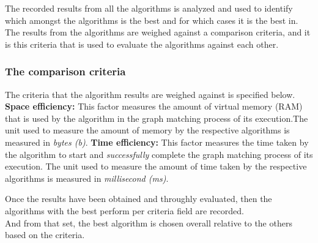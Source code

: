 The recorded results from all the algorithms is analyzed and used to identify which amongst the algorithms is the best and for which cases it is the best in.\\
The results from the algorithms are weighed against a comparison criteria, and it is this criteria that is used to evaluate the algorithms against each other.\\

\subsubsection{The comparison criteria}
The criteria that the algorithm results are weighed against is specified below.\newline
\textbf{Space efficiency:} This factor measures the amount of virtual memory (RAM) that is used by the algorithm in the graph matching process of its
execution.The unit used to measure the amount of memory  by the respective algorithms is measured in \textit{bytes (b)}. \newline
\textbf{Time efficiency:} This factor measures the time taken by the algorithm to start and \textit{successfully} complete the graph matching process of its
execution. The unit used to measure the amount of time taken by the respective algorithms is measured in \textit{millisecond (ms)}. \newline
 \break
 
Once the results have been obtained and throughly evaluated, then the algorithms with the best perform per criteria field are recorded.\\
And from that set, the best algorithm is chosen overall relative to the others based on the criteria.